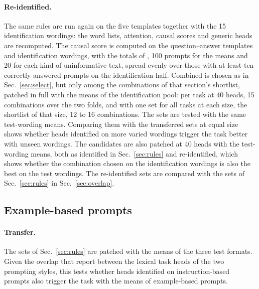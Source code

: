 \documentclass[10pt,a4paper]{article}
\begin{document}
\paragraph{Re-identified.} The same rules are run again on the five templates together with the 15 identification wordings: the word lists, attention, causal scores and generic heads are recomputed. The causal score is computed on the question--answer templates and identification wordings, with the totals of \citet{davidson2025different}, 100 prompts for the means and 20 for each kind of uninformative text, spread evenly over those with at least ten correctly answered prompts on the identification half. Combined is chosen as in Sec.~\ref{sec:select}, but only among the combinations of that section's shortlist, patched in full with the means of the identification pool: per task at 40 heads, 15 combinations over the two folds, and with one set for all tasks at each size, the shortlist of that size, 12 to 16 combinations. The sets are tested with the same test-wording means. Comparing them with the transferred sets at equal size shows whether heads identified on more varied wordings trigger the task better with unseen wordings. The candidates are also patched at 40 heads with the test-wording means, both as identified in Sec.~\ref{sec:rules} and re-identified, which shows whether the combination chosen on the identification wordings is also the best on the test wordings. The re-identified sets are compared with the sets of Sec.~\ref{sec:rules} in Sec.~\ref{sec:overlap}.

\subsection{Example-based prompts}\label{sec:examples}

\paragraph{Transfer.} The sets of Sec.~\ref{sec:rules} are patched with the means of the three test formats. Given the overlap that \citet{yang2026shared} report between the lexical task heads of the two prompting styles, this tests whether heads identified on instruction-based prompts also trigger the task with the means of example-based prompts.
\end{document}
